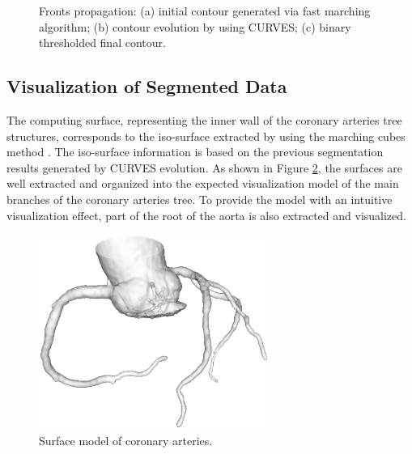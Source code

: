 \begin{figure}[!tb]
{\label{fig:coronary_final}}
\caption{Fronts propagation: (a) initial contour generated via fast marching algorithm; (b) contour evolution by using CURVES; (c) binary thresholded final contour.}%
\label{fig:Evolution}
\end{figure}

\subsection{Visualization of Segmented Data}

The computing surface, representing the inner wall of the coronary arteries tree structures, corresponds to the iso-surface extracted by using the marching cubes method \cite{Lorensen1987MC}.
The iso-surface information is based on the previous segmentation results generated by CURVES evolution.
As shown in Figure \ref{fig:coronary_CURVES_model}, the surfaces are well extracted and organized into the expected visualization model of the main branches of the coronary arteries tree.
To provide the model with an intuitive visualization effect, part of the root of the aorta is also extracted and visualized.
\begin{figure}[tb]
\centering
\includegraphics[height=2.5in]{Figures/coronary/model}
\caption{Surface model of coronary arteries.}%
\label{fig:coronary_CURVES_model}
\end{figure}